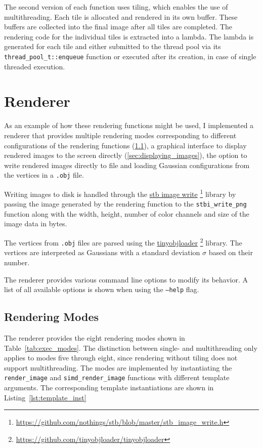 \documentclass[a4paper, 11pt]{memoir}
\begin{document}
    The second version of each function uses tiling, which enables the use of multithreading. Each tile is allocated and
    rendered in its own buffer. These buffers are collected into the final image after all tiles are completed. The
    rendering code for the individual tiles is extracted into a \gls{lambda}. The \gls{lambda} is generated for each tile and either
    submitted to the thread pool via its \texttt{thread_pool_t::enqueue} function or executed after its creation,
    in case of single threaded execution.

    \section{Renderer}
    \label{sec:renderer}
    As an example of how these rendering functions might be used, I implemented a renderer that provides multiple rendering
    modes corresponding to different configurations of the rendering functions (\ref{sec:rendering_modes}), a graphical
    interface to display rendered images to the screen directly (\ref{sec:displaying_images}), the option to write
    rendered images directly to file and loading Gaussian configurations from the vertices in a \texttt{.obj}
    file.

    Writing images to disk is handled through the \href{https://github.com/nothings/stb/blob/master/stb_image_write.h}{stb image write}
    \footnote{\href{https://github.com/nothings/stb/blob/master/stb\_image\_write.h}{https://github.com/nothings/stb/blob/master/stb\_image\_write.h}}
    library by passing the image generated by the rendering function to the \texttt{stbi_write_png} function along
    with the width, height, number of color channels and size of the image data in bytes.

    The vertices from \texttt{.obj} files are parsed using the \href{https://github.com/tinyobjloader/tinyobjloader}{tinyobjloader}
    \footnote{\href{https://github.com/tinyobjloader/tinyobjloader}{https://github.com/tinyobjloader/tinyobjloader}} library. The vertices are interpreted as Gaussians with a
    standard deviation $\sigma$ based on their number.

    The renderer provides various command line options to modify its behavior. A list of all available options is shown
    when using the \texttt{--help} flag.

    \subsection{Rendering Modes}
    \label{sec:rendering_modes}
    The renderer provides the eight rendering modes shown in Table~\ref{tab:exec_modes}. The distinction between single-
    and multithreading only applies to modes five through eight, since rendering without tiling does not support
    multithreading.
    The modes are implemented by instantiating the \texttt{render_image} and \texttt{simd_render_image}
    functions with different template arguments. The corresponding template instantiations are shown in Listing~\ref{lst:template_inst}
\end{document}
